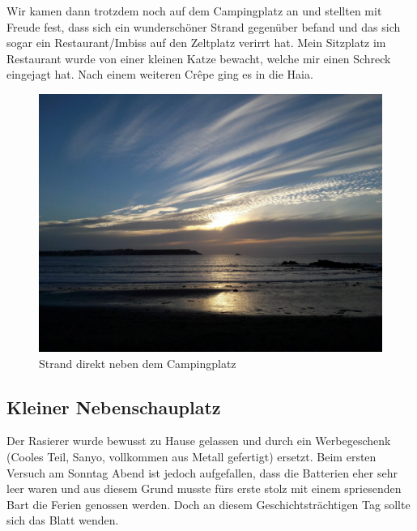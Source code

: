 Wir kamen dann trotzdem noch auf dem Campingplatz an und stellten mit Freude fest, dass sich ein wunderschöner Strand gegenüber befand und das sich sogar ein Restaurant/Imbiss auf den Zeltplatz verirrt hat.
Mein Sitzplatz im Restaurant wurde von einer kleinen Katze bewacht, welche mir einen Schreck eingejagt hat.
Nach einem weiteren Cr\^{e}pe ging es in die Haia.

\begin{figure}[H]
    \centering
    \includegraphics[width=\textwidth]{../Bilder/Bretagne/54.jpg}
    \caption{Strand direkt neben dem Campingplatz}
    \label{img:Strand direkt neben dem Campingplatz}
\end{figure}

\subsection{Kleiner Nebenschauplatz}
Der Rasierer wurde bewusst zu Hause gelassen und durch ein Werbegeschenk (Cooles Teil, Sanyo, vollkommen aus Metall gefertigt) ersetzt.
Beim ersten Versuch am Sonntag Abend ist jedoch aufgefallen, dass die Batterien eher sehr leer waren und aus diesem Grund musste fürs erste stolz mit einem spriesenden Bart die Ferien genossen werden.
Doch an diesem Geschichtsträchtigen Tag sollte sich das Blatt wenden.

